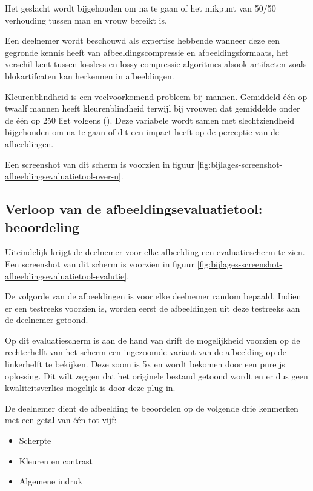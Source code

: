 Het geslacht wordt bijgehouden om na te gaan of het mikpunt van 50/50 verhouding tussen man en vrouw bereikt is.

Een deelnemer wordt beschouwd als expertise hebbende wanneer deze een gegronde kennis heeft van \gls{afbeeldingscompressie} en \glspl{afbeeldingsformaat}, het verschil kent tussen \gls{lossless} en \gls{lossy} \glspl{compressie-algoritme} alsook artifacten zoals blokartifcaten kan herkennen in afbeeldingen.

Kleurenblindheid is een veelvoorkomend probleem bij mannen. Gemiddeld één op twaalf mannen heeft kleurenblindheid terwijl bij vrouwen dat gemiddelde onder de één op 250 ligt volgens  (\cite{porcella2008}). Deze variabele wordt samen met slechtziendheid bijgehouden om na te gaan of dit een impact heeft op de perceptie van de afbeeldingen.

Een screenshot van dit scherm is voorzien in figuur \ref{fig:bijlages-screenshot-afbeeldingsevaluatietool-over-u}.

\subsection{Verloop  van de afbeeldingsevaluatietool: beoordeling}
\label{sec:onderzoek-evaluatietool-verloop-beoordeling}

Uiteindelijk krijgt de deelnemer voor elke afbeelding een evaluatiescherm te zien. Een screenshot van dit scherm is voorzien in figuur \ref{fig:bijlages-screenshot-afbeeldingsevaluatietool-evalutie}.

De volgorde van de afbeeldingen is voor elke deelnemer random bepaald. Indien er een testreeks voorzien is, worden eerst de afbeeldingen uit deze testreeks aan de deelnemer getoond.

Op dit evaluatiescherm is aan de hand van \gls{drift} de mogelijkheid voorzien op de rechterhelft van het scherm een ingezoomde variant van de afbeelding op de linkerhelft te bekijken. Deze zoom is 5x en wordt bekomen door een pure \gls{js} oplossing. Dit wilt zeggen dat het originele bestand getoond wordt en er dus geen kwaliteitsverlies mogelijk is door deze \gls{plug-in}.

De deelnemer dient de afbeelding te beoordelen op de volgende drie kenmerken met een getal van één tot vijf:

\begin{itemize}
	\item Scherpte
	\item Kleuren en contrast
	\item Algemene indruk
\end{itemize}

